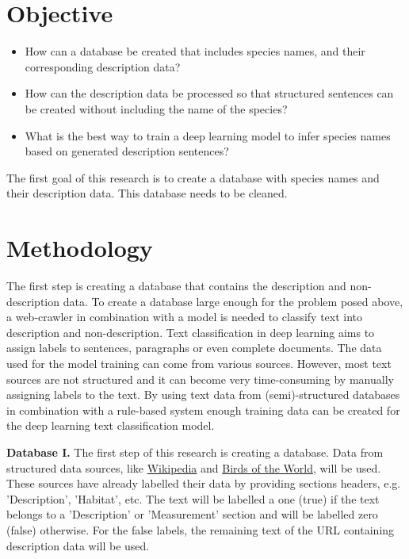 \documentclass{article}
\begin{document}
\section{Objective}
\begin{itemize}
    \item How can a database be created that includes species names, and their corresponding description data?
    \item How can the description data be processed so that structured sentences can be created without including the name of the species?
    \item What is the best way to train a deep learning model to infer species names based on generated description sentences?
\end{itemize}

The first goal of this research is to create a database with species names and their description data.
This database needs to be cleaned.


\section{Methodology}

The first step is creating a database that contains the description and non-description data.
To create a database large enough for the problem posed above, a web-crawler in combination with a model is needed to classify text into description and non-description.
Text classification in deep learning aims to assign labels to sentences, paragraphs or even complete documents. 
The data used for the model training can come from various sources. 
However, most text sources are not structured and it can become very time-consuming by manually assigning labels to the text.
By using text data from (semi)-structured databases in combination with a rule-based system enough training data can be created for the deep learning text classification model.
\newline

\noindent
\textbf{Database I.}
The first step of this research is creating a database.
Data from structured data sources, like \href{http://www.Wikipedia.com}{Wikipedia} and \href{https://birdsoftheworld.org}{Birds of the World}, will be used.
These sources have already labelled their data by providing sections headers, e.g. 'Description', 'Habitat', etc.
The text will be labelled a one (true) if the text belongs to a 'Description' or 'Measurement' section and will be labelled zero (false) otherwise.
For the false labels, the remaining text of the URL containing description data will be used.
\newline
\end{document}
